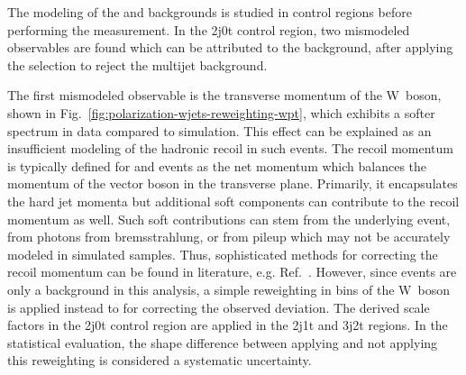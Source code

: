 The modeling of the \wjets and \ttbar backgrounds is studied in control regions before performing the measurement. In the 2j0t control region, two mismodeled observables are found which can be attributed to the \wjets background, after applying the \bdtqcd selection to reject the multijet background. 

The first mismodeled observable is the transverse momentum of the W~boson, shown in Fig.~\ref{fig:polarization-wjets-reweighting-wpt}, which exhibits a softer spectrum in data compared to simulation. This effect can be explained as an insufficient modeling of the hadronic recoil in such events. The recoil momentum is typically defined for \zjets and \wjets events as the net momentum which balances the momentum of the vector boson in the transverse plane. Primarily, it encapsulates the hard jet momenta but additional soft components can contribute to the recoil momentum as well. Such soft contributions can stem from the underlying event, from photons from bremsstrahlung, or from pileup which may not be accurately modeled in simulated samples. Thus, sophisticated methods for correcting the recoil momentum can be found in literature, e.g. Ref.~\cite{Abazov:2009tra}. However, since \wjets events are only a background in this analysis, a simple reweighting in bins of the W~boson \pt is applied instead to for correcting the observed deviation. The derived scale factors in the 2j0t control region are applied in the 2j1t and 3j2t regions. In the statistical evaluation, the shape difference between applying and not applying this reweighting is considered a systematic uncertainty.


